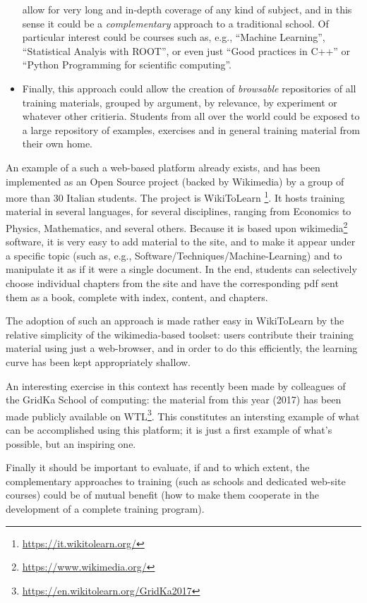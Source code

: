 \documentclass[12pt,a4paper]{article}
\begin{document}
\begin{itemize}
   allow for very long and in-depth coverage of any kind of subject, and in this
   sense it could be a {\it complementary} approach to a traditional school. Of
   particular interest could be courses such as, e.g., ``Machine Learning'',
   ``Statistical Analyis with ROOT'', or even just ``Good practices in C++'' or
   ``Python Programming for scientific computing''.
   \item Finally, this approach could allow the creation of {\it browsable}
   repositories of all training materials, grouped by argument, by relevance, by
   experiment or whatever other critieria. Students from all over the world
   could be exposed to a large repository of examples, exercises and in general
   training material from their own home.
\end{itemize}

An example of a such a web-based platform already exists, and has been
implemented as an Open Source project (backed by Wikimedia) by a group of more
than 30 Italian students. The project is WikiToLearn
\footnote{\url{https://it.wikitolearn.org/}}. It hosts training material in
several languages, for several disciplines, ranging from Economics to Physics,
Mathematics, and several others. Because it is based upon
wikimedia\footnote{\url{https://www.wikimedia.org/}} software, it is very easy
to add material to the site, and to make it appear under a specific topic (such
as, e.g., Software/Techniques/Machine-Learning) and to manipulate it as if it
were a single document. In the end, students can selectively choose individual
chapters from the site and have the corresponding pdf sent them as a book,
complete with index, content, and chapters.

The adoption of such an approach is made rather easy in WikiToLearn by the
relative simplicity of the wikimedia-based toolset: users contribute their
training material using just a web-browser, and in order to do this efficiently,
the learning curve has been kept appropriately shallow.

An interesting exercise in this context has recently been made by colleagues of
the GridKa School of computing: the material from this year (2017) has been made
publicly available on WTL\footnote{\url{https://en.wikitolearn.org/GridKa2017}}.
This constitutes an intersting example of what can be accomplished using this
platform; it is just a first example of what's possible, but an inspiring one.

Finally it should be important to evaluate, if and to which extent, the
complementary approaches to training (such as schools and dedicated web-site
courses) could be of mutual benefit (how to make them cooperate in the
development of a complete training program).
\end{document}
